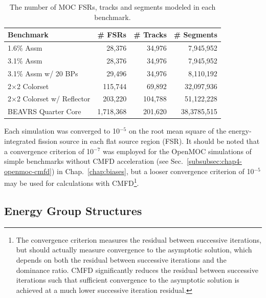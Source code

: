 \begin{table}[h!]
  \centering
  \caption[Number of \ac{FSR}s, tracks and segments for each heterogeneous benchmark]{The number of \ac{MOC} \ac{FSR}s, tracks and segments modeled in each benchmark.}
  \small
  \label{table:chap8-num-fsrs-tracks-segments}
  \vspace{6pt}
  \begin{tabular}{l r r r}
  \toprule
  \rowcolor{lightgray}
  \textbf{Benchmark} &
  \multicolumn{1}{c}{\cellcolor{lightgray} \textbf{\# \ac{FSR}s}} &
  \multicolumn{1}{c}{\cellcolor{lightgray} \textbf{\# Tracks}} &
  \multicolumn{1}{c}{\cellcolor{lightgray} \textbf{\# Segments}} \\
  \midrule
1.6\% Assm & 28,376 & 34,976 & 7,945,952 \\
  \midrule
3.1\% Assm & 28,376 & 34,976 & 7,945,952 \\
  \midrule
3.1\% Assm w/ 20 BPs & 29,496 & 34,976 & 8,110,192  \\
  \midrule
2$\times$2 Colorset & 115,744 & 69,892 & 32,097,936 \\
  \midrule
2$\times$2 Colorset w/ Reflector & 203,220 & 104,788 & 51,122,228 \\
  \midrule
\ac{BEAVRS} Quarter Core & 1,718,368 & 201,620 & 38,3785,515 \\
  \bottomrule
\end{tabular}
\end{table}

Each simulation was converged to 10$^{-5}$ on the root mean square of the energy-integrated fission source in each flat source region (FSR). It should be noted that a convergence criterion of 10$^{-7}$ was employed for the OpenMOC simulations of simple benchmarks without \ac{CMFD} acceleration (see Sec.~\ref{subsubsec:chap4-openmoc-cmfd}) in Chap.~\ref{chap:biases}, but a looser convergence criterion of 10$^{-5}$ may be used for calculations with \ac{CMFD}\footnote{The convergence criterion measures the residual between successive iterations, but should actually measure convergence to the asymptotic solution, which depends on both the residual between successive iterations and the dominance ratio. \ac{CMFD} significantly reduces the residual between successive iterations such that sufficient convergence to the asymptotic solution is achieved at a much lower successive iteration residual.}.

\subsection{Energy Group Structures}
\label{subsec:chap8-energy-groups}

